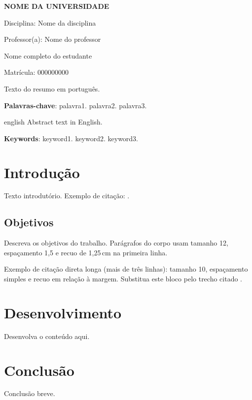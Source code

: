 \documentclass[
  12pt,
  oneside,
  a4paper,
  english,
  brazil
]{abntex2}
\renewcommand{\ABNTEXchapterfont}{\normalfont}
\newcommand{\universidade}{Nome da Universidade}
\newcommand{\disciplina}{Nome da disciplina}
\newcommand{\professor}{Nome do professor}
\newcommand{\estudante}{Nome completo do estudante}
\newcommand{\matricula}{000000000}
\renewcommand{\imprimircapa}{%
  \begin{capa}
    \begin{center}
      {\large\bfseries\MakeUppercase{\universidade}\par}
      \vspace{1.5cm}
      Disciplina: \disciplina\par
      Professor(a): \professor\par
      \vspace{2.5cm}
      {\ABNTEXchapterfont\bfseries\LARGE\imprimirtitulo\par}
      \vfill
      {\large\estudante\par}
      Matrícula: \matricula\par
      \vfill
      {\large\imprimirlocal\par}
      {\large\imprimirdata\par}
    \end{center}
  \end{capa}
}
\begin{document}
\frenchspacing

\imprimircapa
\imprimirfolhaderosto

\begin{resumo}
Texto do resumo em português.

\vspace{\onelineskip}
\noindent\textbf{Palavras-chave}: palavra1. palavra2. palavra3.
\end{resumo}

\begin{resumo}[Abstract]
\begin{otherlanguage*}{english}
Abstract text in English.

\vspace{\onelineskip}
\noindent\textbf{Keywords}: keyword1. keyword2. keyword3.
\end{otherlanguage*}
\end{resumo}

\tableofcontents*
\textual

\chapter{Introdução}

Texto introdutório. Exemplo de citação: \cite{exemplo2020}.

\section{Objetivos}

Descreva os objetivos do trabalho. Parágrafos do corpo usam tamanho 12,
espaçamento 1,5 e recuo de 1,25\,cm na primeira linha.

\begin{citacao}
Exemplo de citação direta longa (mais de três linhas): tamanho 10,
espaçamento simples e recuo em relação à margem. Substitua este bloco
pelo trecho citado \cite{exemplo2020}.
\end{citacao}

\chapter{Desenvolvimento}

Desenvolva o conteúdo aqui.

\chapter{Conclusão}

Conclusão breve.

\postextual

\end{document}
